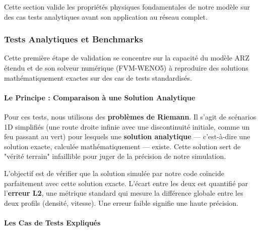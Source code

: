 Cette section valide les propriétés physiques fondamentales de notre modèle sur des cas tests analytiques avant son application au réseau complet.

\subsubsection{Tests Analytiques et Benchmarks}
\label{subsec:tests_analytiques}

Cette première étape de validation se concentre sur la capacité du modèle ARZ étendu et de son solveur numérique (FVM-WENO5) à reproduire des solutions mathématiquement exactes sur des cas de tests standardisés.

\paragraph{Le Principe : Comparaison à une Solution Analytique}

Pour ces tests, nous utilisons des \textbf{problèmes de Riemann}. Il s'agit de scénarios 1D simplifiés (une route droite infinie avec une discontinuité initiale, comme un feu passant au vert) pour lesquels une \textbf{solution analytique} — c'est-à-dire une solution exacte, calculée mathématiquement — existe. Cette solution sert de "vérité terrain" infaillible pour juger de la précision de notre simulation.

L'objectif est de vérifier que la solution simulée par notre code coïncide parfaitement avec cette solution exacte. L'écart entre les deux est quantifié par l'\textbf{erreur L2}, une métrique standard qui mesure la différence globale entre les deux profils (densité, vitesse). Une erreur faible signifie une haute précision.

\paragraph{Les Cas de Tests Expliqués}

